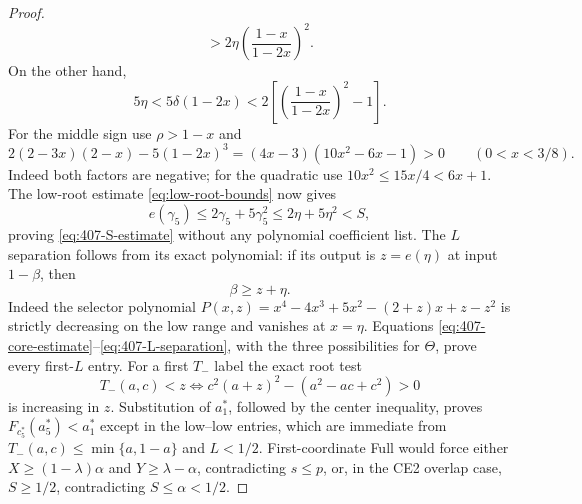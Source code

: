 \begin{proof}
\[ >2\eta\left(\frac{1-x}{1-2x}\right)^2.
\]
On the other hand,
\[
 5\eta<5\delta(1-2x)
 <2\left[\left(\frac{1-x}{1-2x}\right)^2-1\right].
\]
For the middle sign use $\rho>1-x$ and
\[
2(2-3x)(2-x)-5(1-2x)^3
 =(4x-3)(10x^2-6x-1)>0
 \qquad(0<x<3/8).
\]
Indeed both factors are negative; for the quadratic use
$10x^2\le15x/4<6x+1$.
The low-root estimate \eqref{eq:low-root-bounds} now gives
\[
 e(\gamma_5)\le2\gamma_5+5\gamma_5^2
 \le2\eta+5\eta^2<S,
\]
proving \eqref{eq:407-S-estimate} without any polynomial coefficient list.
The $L$ separation follows from its exact polynomial: if its output is
$z=e(\eta)$ at input $1-\beta$, then
\[
 \beta\ge z+\eta.
 \label{eq:407-L-separation}
\]
Indeed the selector polynomial
$P(x,z)=x^4-4x^3+5x^2-(2+z)x+z-z^2$ is strictly decreasing on the low
range and vanishes at $x=\eta$.  Equations
\eqref{eq:407-core-estimate}--\eqref{eq:407-L-separation}, with the three
possibilities for $\Theta$, prove every first-$L$ entry.  For a first $T_-$
label the exact root test
\[
 T_-(a,c)<z\iff c^2(a+z)^2-(a^2-ac+c^2)>0
\]
is increasing in $z$.  Substitution of $a_1^\ast$, followed by the center
inequality, proves $F_{c_5^\ast}(a_5^\ast)<a_1^\ast$ except in the low--low entries, which
are immediate from $T_-(a,c)\le\min\{a,1-a\}$ and $L<1/2$.
First-coordinate Full would force either
$X\ge(1-\lambda)\alpha$ and $Y\ge\lambda-\alpha$, contradicting
$s\le p$, or, in the CE2 overlap case, $S\ge1/2$, contradicting
$S\le\alpha<1/2$.


\end{proof}
